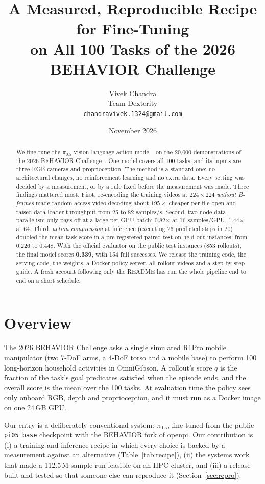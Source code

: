 \documentclass[10pt]{article}
\title{A Measured, Reproducible Recipe for Fine-Tuning \pizf{}\\on All 100 Tasks of the 2026 BEHAVIOR Challenge}
\author{Vivek Chandra \\ Team Dexterity \\ \small \texttt{chandravivek.1324@gmail.com}}
\date{November 2026}
\newcommand{\pizf}{$\pi_{0.5}$}
\begin{document}
\maketitle

\begin{abstract}
We fine-tune the \pizf{} vision-language-action model~\cite{pi05} on the 20{,}000 demonstrations of the 2026
BEHAVIOR Challenge~\cite{behavior1k}. One model covers all 100 tasks, and its inputs are three RGB cameras and
proprioception. The method is a standard one: no architectural changes, no reinforcement learning and no extra data.
Every setting was decided by a measurement, or by a rule fixed before the measurement was made. Three findings mattered
most. First, re-encoding the training videos at $224{\times}224$ \emph{without B-frames} made random-access video
decoding about $195\times$ cheaper per file open and raised data-loader throughput from 25 to 82 samples/s. Second,
two-node data parallelism only pays off at a large per-GPU batch: 0.82$\times$ at 16 samples/GPU, 1.44$\times$ at 64.
Third, \emph{action compression} at inference (executing 26 predicted steps in 20) doubled the mean task score in a
pre-registered paired test on held-out instances, from 0.226 to 0.448. With the official evaluator on the public test
instances (853 rollouts), the final model scores \textbf{0.339}, with 154 full successes. We release the training
code, the serving code, the weights, a Docker policy server, all rollout videos and a step-by-step guide. A fresh account following only the README has run the whole pipeline end to end on a short schedule.
\end{abstract}

\section{Overview}
\label{sec:overview}
The 2026 BEHAVIOR Challenge asks a single simulated R1Pro mobile manipulator (two 7-DoF arms, a 4-DoF torso and a mobile base) to perform 100 long-horizon household activities in OmniGibson. A rollout's score $q$ is the fraction
of the task's goal predicates satisfied when the episode ends, and the overall score is the mean over the 100 tasks.
At evaluation time the policy sees only onboard RGB, depth and proprioception, and it must run as a Docker image on one
24\,GB GPU.

Our entry is a deliberately conventional system: \pizf{}, fine-tuned from the public \texttt{pi05\_base} checkpoint
with the BEHAVIOR fork of openpi. Our contribution is (i) a training and inference recipe in
which every choice is backed by a measurement against an alternative (Table~\ref{tab:recipe}), (ii) the systems work
that made a 112.5\,M-sample run feasible on an HPC cluster, and (iii) a release
built and tested so that someone else can reproduce it (Section~\ref{sec:repro}).
\end{document}
